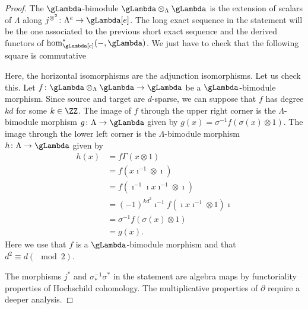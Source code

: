 \documentclass[a4paper]{amsart}
\begin{document}
\begin{proof}
  The \(\gLambda\)-bimodule \(\gLambda\otimes_{\Lambda}\gLambda\) is the extension of scalars of \(\Lambda\) along \(j^{\otimes^2}\colon \Lambda^{e}\to\gLambda[e]\). The long exact sequence in the statement will be the one associated to the previous short exact sequence and the derived functors of \(\hom^*_{\gLambda[e]}(-,\gLambda)\). We just have to check that the following square is commutative
  \begin{center}
  \end{center}
  Here, the horizontal isomorphisms are the adjunction isomorphisms. Let us check this. Let \(f\colon \gLambda\otimes_{\Lambda}\gLambda\to \gLambda\) be a \(\gLambda\)-bimodule morphism. Since source and target are \(d\)-sparse, we can suppose that \(f\) has degree \(kd\) for some \(k\in\ZZ\). The image of \(f\) through the upper right corner is the \(\Lambda\)-bimodule morphism \(g\colon\Lambda\to\gLambda\) given by \(g(x)=\sigma^{-1}f(\sigma(x)\otimes 1)\). The image through the lower left corner is the \(\Lambda\)-bimodule morphism \(h\colon\Lambda\to\gLambda\) given by
  \begin{align*}
      h(x) & =f\Gamma(x\otimes 1)                                            \\
           & =f(x\imath^{-1}\otimes\imath)                                   \\
           & =f(\imath^{-1}\imath x\imath^{-1}\otimes\imath)                 \\
           & =(-1)^{kd^2}\imath^{-1}f(\imath x\imath^{-1}\otimes1)\imath \\
           & = \sigma^{-1} f(\sigma(x)\otimes 1)                             \\
           & =g(x).
  \end{align*}
  Here we use that \(f\) is a \(\gLambda\)-bimodule morphism and that \(d^2\equiv d(\mod 2)\).

  The morphisms \(j^*\) and \(\sigma^{-1}_*\sigma^*\) in the statement are algebra maps by functoriality properties of Hochschild cohomology. The multiplicative properties of \(\partial\) require a deeper analysis.


\end{proof}
\end{document}
